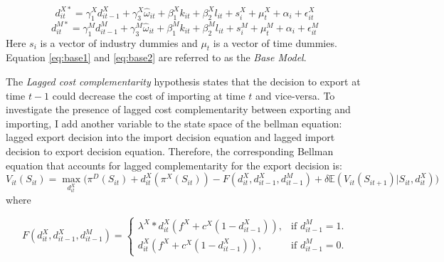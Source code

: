 \documentclass[12pt]{article}
\begin{document}

\begin{equation}
\label{eq:base1}
d_{it}^{X*} = \gamma_{1}^{X} d_{it-1}^{X} + 
\gamma_{3}^{X} \hat{\omega}_{it}  + \beta_{1}^{X}k_{it}  +\beta_{2}^{X}l_{it}+
s_{i}^{X} + \mu_{t}^{X}  + \alpha_{i}+\epsilon_{it}^{X}
\end{equation}
\begin{equation}
\label{eq:base2}
d_{it}^{M*} = \gamma_{1}^{M} d_{it-1}^{M} + 
\gamma_{3}^{M} \hat{\omega}_{it}  + \beta_{1}^{M}k_{it}  +\beta_{2}^{M}l_{it}+
s_{i}^{M} + \mu_{t}^{M}  + \alpha_{i}+\epsilon_{it}^{M}
\end{equation}
Here $s_{i}$ is a vector of industry dummies and $\mu_{t}$ is a vector
of time dummies. Equation \ref{eq:base1} and \ref{eq:base2} are
referred to as the \textit{Base Model}.  






The \textit{Lagged cost complementarity} hypothesis states that the
decision to export at time $t-1$  could decrease the cost of importing at
time $t$ and vice-versa. To investigate the presence of lagged cost complementarity between exporting and
importing, I add another variable to the state space of the bellman equation: lagged export
decision into the import decision equation and lagged import decision
to export decision equation. Therefore, the  corresponding Bellman equation that
accounts for lagged complementarity for the export decision is: 
\begin{equation}
\label{eq:belllagex}
V_{it}(S_{it})= \underset{d_{it}^{X}}{\max} \Big(\pi^{D}(S_{it}) + d_{it}^{X}(\pi^{X}(S_{it})) - F(d_{it}^{X},d_{it-1}^{X}, d_{it-1}^{M})
  + \delta \mathbb{E} (V_{it}(S_{it+1})|S_{it}, d_{it}^{X}) \Big)
\end{equation}
where 
 
\begin{equation}
  F(d_{it}^{X},d_{it-1}^{X}, d_{it-1}^{M})=\begin{cases}
   \lambda^{X} * d_{it}^{X}( f^{X} +c^{X}(1-d_{it-1}^{X})), & \text{if $d_{it-1}^{M}= 1$}.\\
   d_{it}^{X}( f^{X} +c^{X}(1-d_{it-1}^{X})) , & \text{if $d_{it-1}^{M}= 0$}.
  \end{cases}
\end{equation}
\end{document}
